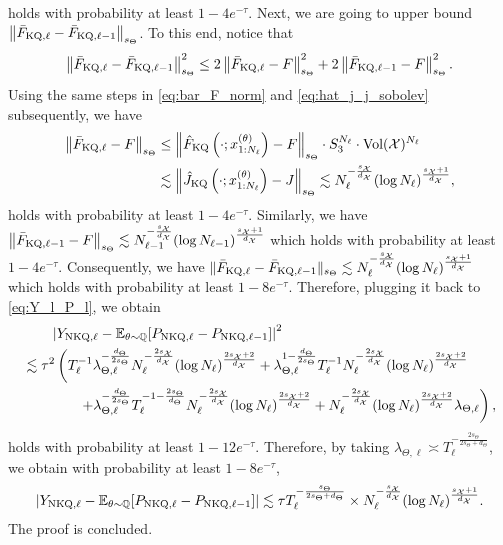 holds with probability at least $1 - 4e^{-\tau}$. 
Next, we are going to upper bound $ \left\| \bar{F}_{\text{KQ}, \ell} - \bar{F}_{\text{KQ}, \ell-1} \right\|_{s_{\Theta}}$. To this end, notice that 
\begin{align*}
    \left\| \bar{F}_{\text{KQ}, \ell} - \bar{F}_{\text{KQ}, \ell-1} \right\|_{s_{\Theta}}^2 \leq 2 \left\| \bar{F}_{\text{KQ}, \ell} - F \right\|_{s_{\Theta}}^2 + 2 \left\| \bar{F}_{\text{KQ}, \ell-1} - F \right\|_{s_{\Theta}}^2 .
\end{align*}
Using the same steps in \eqref{eq:bar_F_norm} and \eqref{eq:hat_j_j_sobolev} subsequently, we have
\begin{align*}
    \left\| \bar{F}_{\text{KQ}, \ell} - F \right\|_{s_{\Theta}} 
    &\leq \left\| \hat{F}_{\text{KQ}} \left( \cdot; x_{1:N_\ell}^{(\theta)} \right) - F \right\|_{s_{\Theta}} \cdot S_3^{N_\ell} \cdot \text{Vol}(\mathcal{X})^{N_\ell} \\
    &\lesssim \left\| \hat{J}_{\text{KQ}} \left( \cdot; x_{1:N_\ell}^{(\theta)} \right) - J \right\|_{s_{\Theta}} \lesssim N_\ell^{-\frac{s_{\mathcal{X}}}{d_{\mathcal{X}}}} (\log N_\ell)^{\frac{s_{\mathcal{X}}+1}{d_{\mathcal{X}}}},
\end{align*}
holds with probability at least $1 - 4e^{-\tau}$.
Similarly, we have $\left\| \bar{F}_{\text{KQ}, \ell-1} - F \right\|_{s_{\Theta}} \lesssim N_{\ell - 1}^{-\frac{s_{\mathcal{X}}}{d_{\mathcal{X}}}} (\log N_{\ell-1})^{\frac{s_{\mathcal{X}}+1}{d_{\mathcal{X}}}}$ which holds with probability at least $1 - 4e^{-\tau}$. 
Consequently, we have $\| \bar{F}_{\text{KQ}, \ell} - \bar{F}_{\text{KQ}, \ell-1}\|_{s_{\Theta}} \lesssim N_\ell^{-\frac{s_{\mathcal{X}}}{d_{\mathcal{X}}}} (\log N_{\ell})^{\frac{s_{\mathcal{X}}+1}{d_{\mathcal{X}}}}$ which holds with probability at least $1 - 8 e^{-\tau}$. Therefore, plugging it back to \eqref{eq:Y_l_P_l}, we obtain
\begin{align*}
    &\qquad \left| Y_{\text{NKQ}, \ell} - \operatorname{\mathbb{E}}_{\theta \sim \mathbb{Q}}[P_{\text{NKQ}, \ell} - P_{\text{NKQ}, \ell-1} ] \right|^2 \\
    &\lesssim \tau^2 \left( T_\ell^{-1} \lambda_{\Theta, \ell}^{ -\frac{d_\Theta}{2s_\Theta} } N_\ell^{-\frac{2s_{\mathcal{X}}}{d_{\mathcal{X}}}} (\log N_{\ell})^{\frac{2s_{\mathcal{X}}+2}{d_{\mathcal{X}}}} + \lambda_{\Theta, \ell}^{1 - \frac{d_\Theta}{2s_\Theta}} T_\ell^{-1} N_\ell^{-\frac{2 s_{\mathcal{X}}}{d_{\mathcal{X}}}} (\log N_{\ell})^{\frac{2s_{\mathcal{X}}+2}{d_{\mathcal{X}}}} \right. \\
    &\qquad\qquad \left. + \lambda_{\Theta, \ell}^{-\frac{d_\Theta}{2s_\Theta}} T_\ell^{-1 - \frac{2s_\Theta}{d_\Theta}}  N_\ell^{-\frac{2 s_{\mathcal{X}}}{d_{\mathcal{X}}}} (\log N_{\ell})^{\frac{2s_{\mathcal{X}}+2}{d_{\mathcal{X}}}} + N_\ell^{-\frac{2 s_{\mathcal{X}}}{d_{\mathcal{X}}}} (\log N_{\ell})^{\frac{2s_{\mathcal{X}}+2}{d_{\mathcal{X}}}} \lambda_{\Theta, \ell}  \right) ,
\end{align*}
holds with probability at least $1 - 12 e^{-\tau}$.
Therefore, by taking $\lambda_{\Theta, \ell} \asymp T_\ell^{-\frac{2 s_\Theta}{2 s_\Theta +d_\Theta }}$, we obtain with probability at least $1 - 8 e^{-\tau}$,
\begin{align*}
    \left| Y_{\text{NKQ}, \ell} - \operatorname{\mathbb{E}}_{\theta \sim \mathbb{Q}}[P_{\text{NKQ}, \ell} - P_{\text{NKQ}, \ell-1}] \right| \lesssim \tau T_\ell^{-\frac{s_\Theta}{2 s_\Theta +d_\Theta }} \times N_\ell^{-\frac{s_{\mathcal{X}}}{d_{\mathcal{X}}}} (\log N_{\ell})^{\frac{s_{\mathcal{X}}+1}{d_{\mathcal{X}}}}.
\end{align*}
The proof is concluded.


